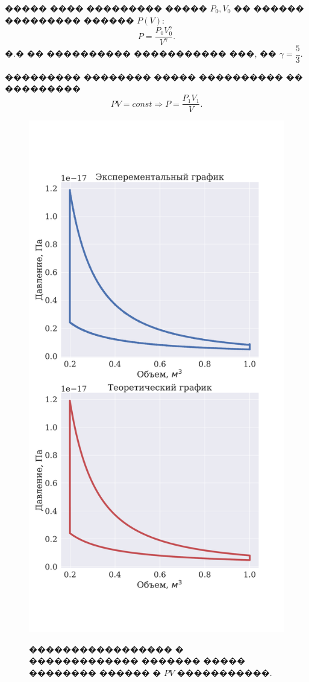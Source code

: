 ����� ���� ��������� ����� $P_0, V_0$ �� ������ ��������� ������ $P(V)$:
\[P = \dfrac{P_0 V_0^\gamma}{V ^\gamma}. \]
�.� �� ���������� ����������� ���, �� $\gamma = \dfrac{5}{3}$.

��������� �������� ����� ���������� �� ���������
$$PV = const \Rightarrow P = \dfrac{P_1 V_1}{V}.$$
\begin{figure}[!h]
{\includegraphics[width=1\linewidth]{cycle}}
    \caption{����������������� � ������������� ������� ����� �������� ������ � $PV$ �����������.}
\end{figure}

